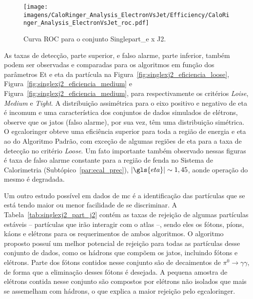 \begin{figure}[ht]
\centering
\texttt{[image: imagens/CaloRinger\_Analysis\_ElectronVsJet/Efficiency/CaloRinger\_Analysis\_ElectronVsJet\_roc.pdf]}
\caption{Curva ROC para o conjunto Singlepart\_e x J2.}
\label{fig:singlexj2_roc}
\end{figure}

As taxas de detecção, parte superior, e falso alarme, parte inferior, também podem ser 
observadas e comparadas para os algoritmos em função dos parâmetros \gls{Et} e \gls{eta} 
da partícula na Figura~\ref{fig:singlexj2_eficiencia_loose},
Figura~\ref{fig:singlexj2_eficiencia_medium} e Figura~\ref{fig:singlexj2_eficiencia_medium}, 
para respectivamente os critérios \emph{Loise}, \emph{Medium} e \emph{Tight}. A
distribuição assimétrica para o eixo positivo e negativo de \gls{eta} é incomum
e uma característica dos conjuntos de dados simulados de elétrons, observe que
os jatos (falso alarme), por sua vez, têm uma distribuição simétrica. O
\gls{egcaloringer} obteve uma eficiência superior para toda a região de energia
e \gls{eta} ao do Algoritmo Padrão, com exceção de algumas regiões de \gls{eta}
para a taxa de detecção no critério \emph{Loose}. Um fato importante também
observado nessas figuras é taxa de falso alarme constante para a região de fenda
no Sistema de Calorimetria (Subtópico~\ref{par:ecal_prec}), $|\gls{eta}|\sim1,45$, 
aonde operação do mesmo é degradada.

Um outro estudo possível em dados de \gls{mc} é a identificação das partículas
que se está tendo maior ou menor facilidade de se discriminar. A
Tabela~\ref{tab:singlexj2_part_j2} contém as taxas de rejeição de algumas
partículas estáveis -- partículas que irão interagir com o \gls{atlas} --, sendo
eles os fótons, píons, káons e elétrons para os requerimentos de ambos
algoritmos. O algoritmo proposto possuí um melhor potencial de rejeição para
todas as partículas desse conjunto de dados, como os hádrons que compõem os
jatos, incluindo fótons e elétrons. Parte dos fótons contidos nesse
conjunto são de decaimentos de $\pi^0\rightarrow\gamma\gamma$, de forma que a
eliminação desses fótons é desejada. A pequena amostra de elétrons contida nesse
conjunto são compostos por elétrons não isolados que mais se assemelham com
hádrons, o que explica a maior rejeição pelo \gls{egcaloringer}.

